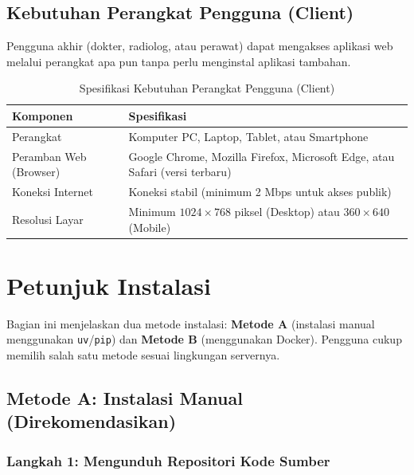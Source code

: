 \documentclass[12pt,a4paper]{article}
\begin{document}
\subsection{Kebutuhan Perangkat Pengguna (Client)}

Pengguna akhir (dokter, radiolog, atau perawat) dapat mengakses aplikasi web
melalui perangkat apa pun tanpa perlu menginstal aplikasi tambahan.

\begin{table}[H]
\centering
\caption{Spesifikasi Kebutuhan Perangkat Pengguna (Client)}
\begin{tabularx}{\textwidth}{l X}
\toprule
\textbf{Komponen}        & \textbf{Spesifikasi} \\
\midrule
Perangkat                & Komputer PC, Laptop, Tablet, atau Smartphone \\
Peramban Web (Browser)   & Google Chrome, Mozilla Firefox, Microsoft Edge, atau Safari (versi terbaru) \\
Koneksi Internet         & Koneksi stabil (minimum 2 Mbps untuk akses publik) \\
Resolusi Layar           & Minimum $1024\times768$ piksel (Desktop) atau $360\times640$ (Mobile) \\
\bottomrule
\end{tabularx}
\end{table}


\section{Petunjuk Instalasi}

Bagian ini menjelaskan dua metode instalasi: \textbf{Metode A} (instalasi
manual menggunakan \texttt{uv}/\texttt{pip}) dan \textbf{Metode B} (menggunakan
Docker). Pengguna cukup memilih salah satu metode sesuai lingkungan servernya.

\subsection{Metode A: Instalasi Manual (Direkomendasikan)}

\subsubsection{Langkah 1: Mengunduh Repositori Kode Sumber}
\end{document}

